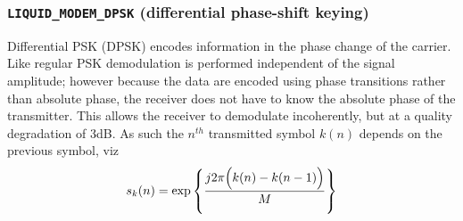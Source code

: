 \subsubsection{{\tt LIQUID\_MODEM\_DPSK} (differential phase-shift keying)}
\label{module:modem:digital:DPSK}
Differential PSK (DPSK) encodes information in the phase change of the
carrier.
Like regular PSK
demodulation is performed independent of the signal amplitude;
however because the data are encoded using phase transitions rather than
absolute phase, the receiver does not have to know the absolute phase of
the transmitter.
This allows the receiver to demodulate incoherently, but at a quality
degradation of 3dB.
%
As such the $n^{th}$ transmitted symbol $k(n)$ depends on the previous
symbol, viz
%
\begin{equation}
    s_k(n) = \exp\left\{
                \frac{
                    j 2 \pi \Bigl(k(n) - k(n-1)\Bigr)
                } {
                    M
                }
            \right\}
\end{equation}

